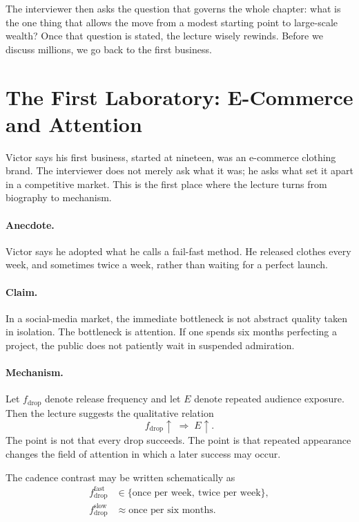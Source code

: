 The interviewer then asks the question that governs the whole chapter: what is the one thing that allows the move from a modest starting point to large-scale wealth? Once that question is stated, the lecture wisely rewinds. Before we discuss millions, we go back to the first business.

\section{The First Laboratory: E-Commerce and Attention}

Victor says his first business, started at nineteen, was an e-commerce clothing brand. The interviewer does not merely ask what it was; he asks what set it apart in a competitive market. This is the first place where the lecture turns from biography to mechanism.

\paragraph{Anecdote.}
Victor says he adopted what he calls a fail-fast method. He released clothes every week, and sometimes twice a week, rather than waiting for a perfect launch.

\paragraph{Claim.}
In a social-media market, the immediate bottleneck is not abstract quality taken in isolation. The bottleneck is attention. If one spends six months perfecting a project, the public does not patiently wait in suspended admiration.

\paragraph{Mechanism.}
Let \(f_{\text{drop}}\) denote release frequency and let \(E\) denote repeated audience exposure. Then the lecture suggests the qualitative relation
\begin{equation}
f_{\text{drop}} \uparrow \;\Rightarrow\; E \uparrow.
\end{equation}
The point is not that every drop succeeds. The point is that repeated appearance changes the field of attention in which a later success may occur.

The cadence contrast may be written schematically as
\begin{align}
f_{\text{drop}}^{\text{fast}} &\in \{\text{once per week},\ \text{twice per week}\}, \\
f_{\text{drop}}^{\text{slow}} &\approx \text{once per six months}.
\end{align}

